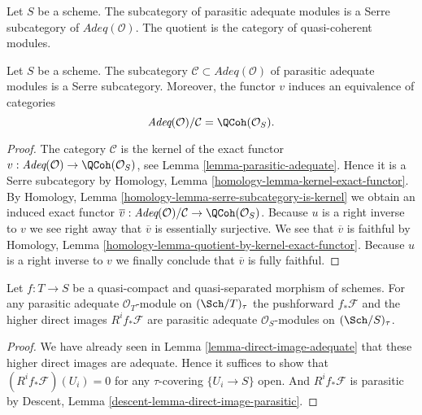 \noindent
Let $S$ be a scheme.
The subcategory of parasitic adequate modules is a Serre subcategory of
$\textit{Adeq}(\mathcal{O})$. The quotient is the category of
quasi-coherent modules.

\begin{lemma}
\label{lemma-adequate-by-parasitic}
Let $S$ be a scheme. The subcategory
$\mathcal{C} \subset \textit{Adeq}(\mathcal{O})$ of parasitic adequate
modules is a Serre subcategory. Moreover, the functor $v$ induces
an equivalence of categories
$$
\textit{Adeq}(\mathcal{O}) / \mathcal{C} = \QCoh(\mathcal{O}_S).
$$
\end{lemma}

\begin{proof}
The category $\mathcal{C}$ is the kernel of the exact functor
$v : \textit{Adeq}(\mathcal{O}) \to \QCoh(\mathcal{O}_S)$, see
Lemma \ref{lemma-parasitic-adequate}.
Hence it is a Serre subcategory by
Homology, Lemma \ref{homology-lemma-kernel-exact-functor}.
By
Homology, Lemma \ref{homology-lemma-serre-subcategory-is-kernel}
we obtain an induced exact functor
$\overline{v} :
\textit{Adeq}(\mathcal{O}) / \mathcal{C}
\to
\QCoh(\mathcal{O}_S)$.
Because $u$ is a right inverse to $v$ we see right away that
$\overline{v}$ is essentially surjective.
We see that $\overline{v}$ is faithful by
Homology, Lemma \ref{homology-lemma-quotient-by-kernel-exact-functor}.
Because $u$ is a right inverse to $v$ we finally conclude that
$\overline{v}$ is fully faithful.
\end{proof}

\begin{lemma}
\label{lemma-direct-image-parasitic-adequate}
Let $f : T \to S$ be a quasi-compact and quasi-separated morphism
of schemes. For any parasitic adequate $\mathcal{O}_T$-module on
$(\Sch/T)_\tau$ the pushforward
$f_*\mathcal{F}$ and the higher direct images $R^if_*\mathcal{F}$
are parasitic adequate $\mathcal{O}_S$-modules on $(\Sch/S)_\tau$.
\end{lemma}

\begin{proof}
We have already seen in
Lemma \ref{lemma-direct-image-adequate}
that these higher direct images are adequate.
Hence it suffices to show that
$(R^if_*\mathcal{F})(U_i) = 0$ for any $\tau$-covering
$\{U_i \to S\}$ open. And $R^if_*\mathcal{F}$
is parasitic by
Descent, Lemma \ref{descent-lemma-direct-image-parasitic}.
\end{proof}














